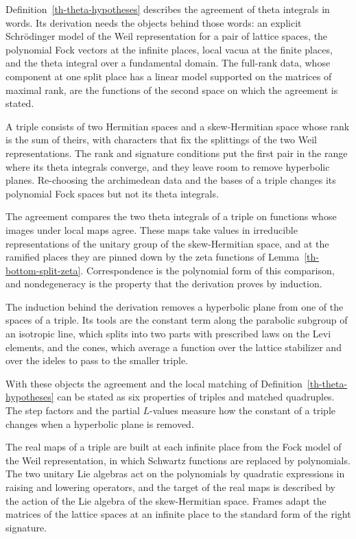 Definition~\ref{th-theta-hypotheses} describes the agreement of theta
integrals in words. Its derivation needs the objects behind those words: an
explicit Schrödinger model of the Weil representation for a pair of lattice
spaces, the polynomial Fock vectors at the infinite places, local vacua at the
finite places, and the theta integral over a fundamental domain. The full-rank
data, whose component at one split place has a linear model supported on the
matrices of maximal rank, are the functions of the second space on which the
agreement is stated.

A triple consists of two Hermitian spaces and a skew-Hermitian space whose rank
is the sum of theirs, with characters that fix the splittings of the two Weil
representations. The rank and signature conditions put the first pair in the
range where its theta integrals converge, and they leave room to remove
hyperbolic planes. Re-choosing the archimedean data and the bases of a triple
changes its polynomial Fock spaces but not its theta integrals.

The agreement compares the two theta integrals of a triple on functions whose
images under local maps agree. These maps take values in irreducible
representations of the unitary group of the skew-Hermitian space, and at the
ramified places they are pinned down by the zeta functions of
Lemma~\ref{th-bottom-split-zeta}. Correspondence is the polynomial form of this
comparison, and nondegeneracy is the property that the derivation proves by
induction.

The induction behind the derivation removes a hyperbolic plane from one of the
spaces of a triple. Its tools are the constant term along the parabolic
subgroup of an isotropic line, which splits into two parts with prescribed
laws on the Levi elements, and the cones, which average a function over the
lattice stabilizer and over the ideles to pass to the smaller triple.

With these objects the agreement and the local matching of
Definition~\ref{th-theta-hypotheses} can be stated as six properties of triples
and matched quadruples. The step
factors and the partial $L$-values measure how the constant of a triple
changes when a hyperbolic plane is removed.

The real maps of a triple are built at each infinite place from the Fock model
of the Weil representation, in which Schwartz functions are replaced by
polynomials. The two unitary Lie algebras act on the polynomials by quadratic
expressions in raising and lowering operators, and the target of the real maps
is described by the action of the Lie algebra of the skew-Hermitian space.
Frames adapt the matrices of the lattice spaces at an infinite place to the
standard form of the right signature.

